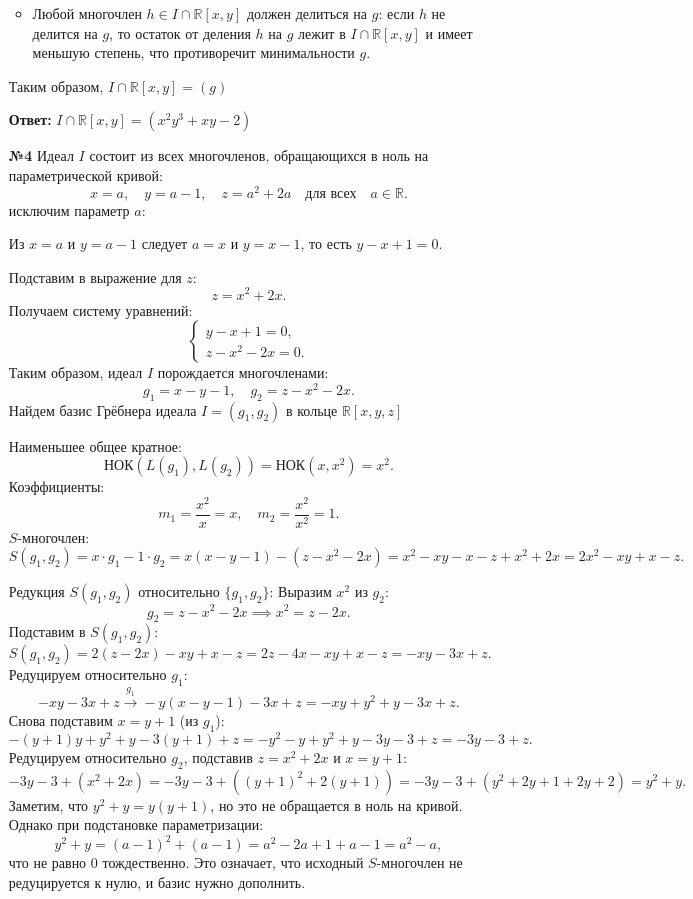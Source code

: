 \documentclass[a4paper]{article}
\begin{document}
\begin{enumerate}
\begin{itemize}
    \item Любой многочлен \( h \in I \cap \mathbb{R}[x,y] \) 
    должен делиться на \( g \): если \( h \) не делится на \( g \), 
    то остаток от деления \( h \) на \( g \) лежит в \( I \cap \mathbb{R}[x,y] \) 
    и имеет меньшую степень, что противоречит минимальности \( g \).  
   \end{itemize}

  Таким образом, \( I \cap \mathbb{R}[x,y] = (g) \) 

  \textbf{Ответ: } $I \cap \mathbb{R}[x,y] = \left( x^{2} y^{3} + x y - 2 \right)$\\

  \item[\textbf{№4}]
  Идеал \( I \) состоит из всех многочленов, обращающихся в ноль на параметрической кривой:
  \[
  x = a, \quad y = a - 1, \quad z = a^2 + 2a \quad \text{для всех} \quad a \in \mathbb{R}.
  \]
  исключим параметр \( a \):
  
  Из \( x = a \) и \( y = a - 1 \) следует \( a = x \) и \( y = x - 1 \), то есть \( y - x + 1 = 0 \).
  
  Подставим в выражение для \( z \):  
  \[
  z = x^2 + 2x.
  \]
  Получаем систему уравнений:
  \[
  \begin{cases}
  y - x + 1 = 0, \\
  z - x^2 - 2x = 0.
  \end{cases}
  \]
  Таким образом, идеал \( I \) порождается многочленами:
  \[
  g_1 = x - y - 1, \quad g_2 = z - x^2 - 2x.
  \]
  Найдем базис Грёбнера идеала \( I = (g_1, g_2) \) в кольце \( \mathbb{R}[x, y, z] \)

  Наименьшее общее кратное:  
    \[
    \text{НОК}(L(g_1), L(g_2)) = \text{НОК}(x, x^2) = x^2.
    \]
  Коэффициенты:  
    \[
    m_1 = \frac{x^2}{x} = x, \quad m_2 = \frac{x^2}{x^2} = 1.
    \]
  \( S \)-многочлен:  
    \[
    S(g_1, g_2) = x \cdot g_1 - 1 \cdot g_2 = x(x - y - 1) - (z - x^2 - 2x) = x^2 - xy - x - z + x^2 + 2x = 2x^2 - xy + x - z.
    \]
    
Редукция \( S(g_1, g_2) \) относительно \( \{g_1, g_2\} \):
  Выразим \( x^2 \) из \( g_2 \):  
    \[
    g_2 = z - x^2 - 2x \implies x^2 = z - 2x.
    \]
  Подставим в \( S(g_1, g_2) \):  
    \[
    S(g_1, g_2) = 2(z - 2x) - xy + x - z = 2z - 4x - xy + x - z = -xy - 3x + z.
    \]
   Редуцируем относительно \( g_1 \):  
    \[
    -xy - 3x + z \xrightarrow{g_1} -y(x - y - 1) - 3x + z = -xy + y^2 + y - 3x + z.
    \]
   Снова подставим \( x = y + 1 \) (из \( g_1 \)):  
    \[
    - (y+1)y + y^2 + y - 3(y+1) + z = -y^2 - y + y^2 + y - 3y - 3 + z = -3y - 3 + z.
    \]
   Редуцируем относительно \( g_2 \), подставив \( z = x^2 + 2x \) и \( x = y + 1 \):  
    \[
    -3y - 3 + (x^2 + 2x) = -3y - 3 + ((y+1)^2 + 2(y+1)) =
     -3y - 3 + (y^2 + 2y + 1 + 2y + 2) = y^2 + y.
    \]
   Заметим, что \( y^2 + y = y(y + 1) \), но это не обращается в ноль
    на кривой. Однако при подстановке параметризации:  
    \[
    y^2 + y = (a-1)^2 + (a-1) = a^2 - 2a + 1 + a - 1 = a^2 - a,
    \]
    что не равно \( 0 \) тождественно. Это означает, что исходный
     \( S \)-многочлен не редуцируется к нулю, и базис нужно дополнить.


\end{enumerate}
\end{document}
